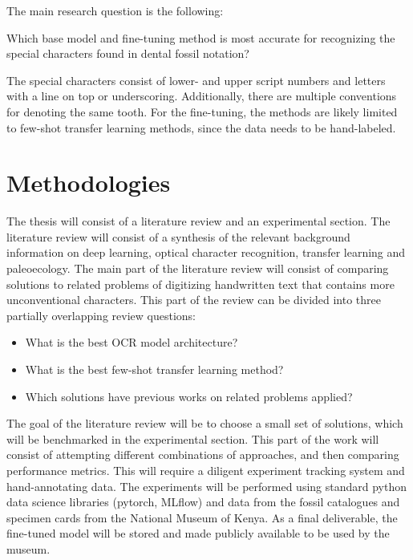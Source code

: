 \documentclass{article}
\begin{document}
The main research question is the following:

Which base model and fine-tuning method is most accurate for recognizing the special 
characters found in dental fossil notation?

The special characters consist of lower- and upper script numbers and letters with 
a line on top or underscoring. Additionally, there are multiple conventions for denoting the 
same tooth. For the fine-tuning, the methods are likely limited to few-shot transfer learning 
methods, since the data needs to be hand-labeled.

\section{Methodologies}




The thesis will consist of a literature review and an experimental section.
The literature review will consist of a synthesis of the relevant background 
information on deep learning, optical character recognition, transfer learning and 
paleoecology.
The main part of the literature review will consist of comparing
solutions to related problems of digitizing handwritten text that contains 
more unconventional characters. This part of the review can be divided into three partially overlapping review 
questions:

\begin{itemize}
    \item What is the best OCR model architecture?
    \item What is the best few-shot transfer learning method?
    \item Which solutions have previous works on related problems applied?
\end{itemize}

The goal of the literature review will be to choose a small set of solutions, which will be 
benchmarked in the experimental section. This part of the work will consist of attempting 
different combinations of approaches, and then comparing performance metrics. This will require a 
diligent experiment tracking system and hand-annotating data. The experiments will be performed 
using standard python data science libraries (pytorch, MLflow) and
 data from the fossil catalogues and specimen cards from the National Museum of Kenya. As a final deliverable,
 the fine-tuned model will be stored and made publicly available to be used by the museum.
\end{document}
